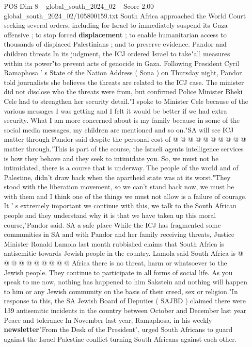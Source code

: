 \begin{textsample}{POS Dim 8 – global\_south\_2024\_02 – Score 2.00 – global\_south\_2024\_02/105800159.txt}  \label{ex:f8_pos_388}
South Africa approached the World Court seeking several orders, including for Israel to immediately suspend its Gaza offensive ; to stop forced \textbf{displacement} ; to enable humanitarian access to thousands of displaced Palestinians ; and to preserve evidence.
Pandor and children threats In its judgment, the ICJ ordered Israel to take"all measures within its power"to prevent acts of genocide in Gaza.
Following President Cyril Ramaphosa ' s State of the Nation Address ( Sona ) on Thursday night, Pandor told journalists she believes the threats are related to the ICJ case.
The minister did not disclose who the threats were from, but confirmed Police Minister Bheki Cele had to strengthen her security detail."I spoke to Minister Cele because of the various messages I was getting and I felt it would be better if we had extra security.
What I am more concerned about is my family because in some of the social media messages, my children are mentioned and so on."SA will see ICJ matter through Pandor said despite the personal cost of @ @ @ @ @ @ @ @ @ @ matter through."This is part of the course, the Israeli agents intelligence services is how they behave and they seek to intimidate you.
So, we must not be intimidated, there is a course that is underway.
The people of the world and of Palestine, didn't draw back when the apartheid state was at its worst."They stood with the liberation movement, so we can't stand back now, we must be with them and I think one of the things we must not allow is a failure of courage.
It ' s extremely important we continue with this, we talk to the South African people and they understand why it is that we have taken up this moral course,"Pandor said.
SA a safe place While the ICJ has fragmented some communities in SA and with Pandor and her family receiving threats, Justice Minister Ronald Lamola last month rubbished claims that South Africa is antisemitic towards Jewish people in the country.
Lamola said South Africa is @ @ @ @ @ @ @ @ @ @ Africa there is no threat, harm or whatsoever to the Jewish people.
They continue to participate in all forms of social life.
As you speak to me now, nothing has happened to him Sakstein and nothing will happen to him or any Jewish community on the basis of their creed, sex or religion."In response to this, the SA Jewish Board of Deputies ( SAJBD ) claimed there were 139 antisemitic incidents in the country between October and December last year Peace and tolerance In November last year, Ramaphosa, in his weekly \textbf{newsletter}"From the Desk of the President", urged South Africans to guard against the Israel-Palestine conflict turning South Africans against each other.

\end{textsample}
